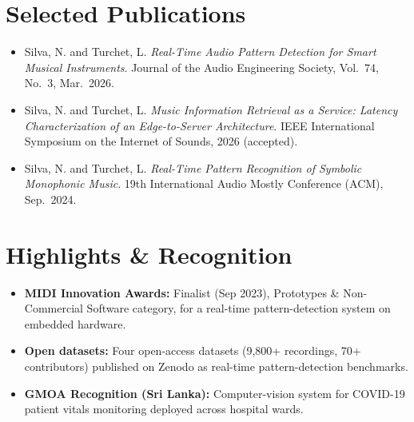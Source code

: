 \documentclass[11pt]{article}
\begin{document}
\enlargethispage{3\baselineskip}
\section*{Selected Publications \footnotesize {}}
\begin{itemize}[leftmargin=1.2em, itemsep=-0.25em]
    \item Silva, N. and Turchet, L. \textit{Real-Time Audio Pattern Detection for Smart Musical Instruments}. Journal of the Audio Engineering Society, Vol.~74, No.~3, Mar.~2026.
    \item Silva, N. and Turchet, L. \textit{Music Information Retrieval as a Service: Latency Characterization of an Edge-to-Server Architecture}. IEEE International Symposium on the Internet of Sounds, 2026 (accepted).
    \item Silva, N. and Turchet, L. \textit{Real-Time Pattern Recognition of Symbolic Monophonic Music}. 19th International Audio Mostly Conference (ACM), Sep.~2024.
\end{itemize}

\vspace{-0.3em}
\section*{Highlights \& Recognition}
\begin{itemize}[leftmargin=1.2em, itemsep=-0.25em]
    \item \textbf{MIDI Innovation Awards:} Finalist (Sep 2023), Prototypes \& Non-Commercial Software category, for a real-time pattern-detection system on embedded hardware.
    \item \textbf{Open datasets:} Four open-access datasets (9,800+ recordings, 70+ contributors) published on Zenodo as real-time pattern-detection benchmarks.
    \item \textbf{GMOA Recognition (Sri Lanka):} Computer-vision system for COVID-19 patient vitals monitoring deployed across hospital wards.
\end{itemize}
\end{document}
